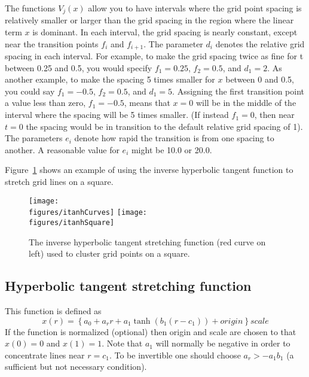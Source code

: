 The functions $V_j(x)$ allow you to have intervals where the grid
point spacing is relatively smaller or larger than the grid spacing in
the region where the linear term $x$ is dominant.  In each interval,
the grid spacing is nearly constant, except near the transition points
$f_i$ and $f_{i+1}$.  The parameter $d_i$ denotes the relative grid
spacing in each interval.  For example, to make the grid spacing twice
as fine for t between 0.25 and 0.5, you would specify $f_1=0.25$,
$f_2=0.5$, and $d_1=2$.  As another example, to make the spacing 5
times smaller for $x$ between 0 and 0.5, you could say $f_1=-0.5$,
$f_2=0.5$, and
$d_1=5$.  Assigning the first transition point a value less than zero,
$f_1=-0.5$, means that $x=0$ will be in the middle of the interval
where the spacing will be 5 times smaller.  (If instead $f_1=0 $, then
near $t=0 $ the spacing would be in transition to the default relative
grid spacing of 1).  The parameters $e_i$ denote how rapid the
transition is from one spacing to another.  A reasonable value for
$e_i$ might be 10.0 or 20.0. 


Figure~\ref{fig:itanhStretch} shows an example of using the inverse hyperbolic tangent function
to stretch grid lines on a square.
\begin{figure}
  \begin{center}
  \texttt{[image: \\figures/itanhCurves]}
  \texttt{[image: \\figures/itanhSquare]}
  \end{center}
  \caption{The inverse hyperbolic tangent stretching function (red curve on left) used to cluster grid points on a square.}\label{fig:itanhStretch}
\end{figure}


\subsection{Hyperbolic tangent stretching function}

This function is defined as
$$
    x(r) = \left\{ a_0 + a_r r + a_1 \tanh( b_1(r-c_1) ) + origin \right\} scale
$$
If the function is normalized (optional) then origin and scale are chosen to that $x(0)=0$ and $x(1)=1$. 
Note that $a_1$ will normally be negative in order to concentrate lines near $r=c_1$.
To be invertible one should choose $a_r > -a_1 b_1$ 
(a sufficient but not necessary condition).

